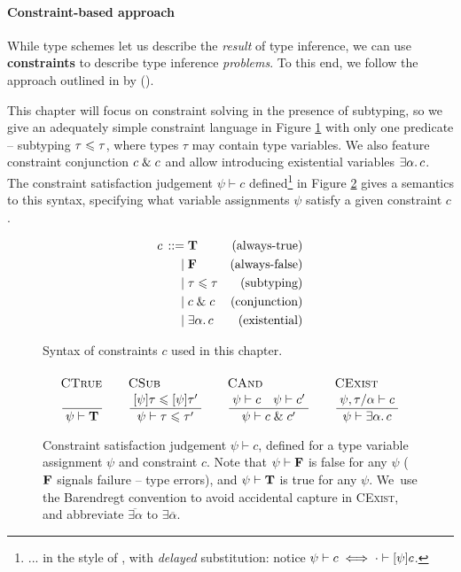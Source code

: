 \paragraph{Constraint-based approach} While type schemes let us describe the \emph{result} of type inference, we can use \textbf{constraints} to describe type inference \emph{problems}. To this end, we follow the approach outlined in  by \textcite{essence-of-ml-type-inference} (\textcite[Chapter~10]{adv-tapl}).

This chapter will focus on constraint solving in the presence of subtyping, so we give an adequately simple constraint language in Figure \ref{fig:constraints} with only one predicate -- subtyping $\tau \leqslant \tau$, where types $\tau$ may contain type variables. We also feature constraint conjunction $c \;\&\; c$ and allow introducing existential variables $\exists \alpha \ldotp c$. The constraint satisfaction judgement $\psi \vdash c$ defined\footnote{... in the style of \textcite{constraint-based-freeze-ml}, with \emph{delayed} substitution: notice $\psi \vdash c \iff \cdot \vdash \substx \psi c$.} in Figure \ref{fig:satisfaction} gives a semantics to this syntax, specifying what variable assignments $\psi$ satisfy a given constraint $c$. 

\begin{figure}
    \centering
    \begin{align*}
        {c} \,::=&\; 
        \mathbf T
        & \text{(always-true)}
        \\ \mid&\;
        \mathbf F
        & \text{(always-false)}
        \\ \mid&\;
        \tau \leqslant \tau 
        & \text{(subtyping)}
        \\ \mid&\;
        c \;\&\; c
         & \text{(conjunction)}
        \\ \mid&\; 
        \exists \alpha \ldotp c
        & \text{(existential)}
    \end{align*}
    \caption{Syntax of constraints $c$ used in this chapter.}
    \label{fig:constraints}
\end{figure}

\begin{figure}
    \centering
    $$
    \irule{CTrue}{}{\psi \vdash \tru}
    \quad
    \irule{CSub}{\substx \psi \tau \sub \substx \psi \tau'}{\psi \vdash \tau \sub \tau'}
    \quad
    \irule{CAnd}{\psi \vdash c \quad \psi \vdash c'}{\psi \vdash c \und c'}
    \quad 
    \irule{CExist}{\psi, \tau/\alpha \vdash c}{\psi \vdash \exists \alpha \ldotp c}
    $$
    \caption{Constraint satisfaction judgement $\psi \vdash c$, defined for a type variable assignment $\psi$ and constraint $c$. Note that $\psi \vdash \mathbf F$ is false for any $\psi$ ($\mathbf F$ signals failure -- type errors), and $\psi \vdash \mathbf T$ is true for any $\psi$. We~use the Barendregt convention to avoid accidental capture in \textsc{CExist}, and abbreviate $\overline {\exists \alpha}$ to $\exists \overline{\alpha}$.}
    \label{fig:satisfaction}
\end{figure}
 

